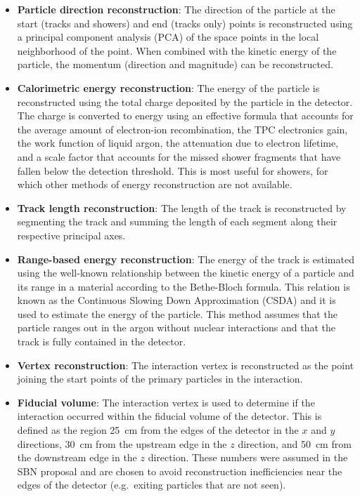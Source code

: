 \begin{itemize}
    \item \textbf{Particle direction reconstruction}: The direction of the particle at the start (tracks and showers) and end (tracks only) points is reconstructed using a principal component analysis (PCA) of the space points in the local neighborhood of the point. When combined with the kinetic energy of the particle, the momentum (direction and magnitude) can be reconstructed.
    \item \textbf{Calorimetric energy reconstruction}: The energy of the particle is reconstructed using the total charge deposited by the particle in the detector. The charge is converted to energy using an effective formula that accounts for the average amount of electron-ion recombination, the TPC electronics gain, the work function of liquid argon, the attenuation due to electron lifetime, and a scale factor that accounts for the missed shower fragments that have fallen below the detection threshold. This is most useful for showers, for which other methods of energy reconstruction are not available.
    \item \textbf{Track length reconstruction}: The length of the track is reconstructed by segmenting the track and summing the length of each segment along their respective principal axes. 
    \item \textbf{Range-based energy reconstruction}: The energy of the track is estimated using the well-known relationship between the kinetic energy of a particle and its range in a material according to the Bethe-Bloch formula. This relation is known as the Continuous Slowing Down Approximation (CSDA) and it is used to estimate the energy of the particle. This method assumes that the particle ranges out in the argon without nuclear interactions and that the track is fully contained in the detector.
    \item \textbf{Vertex reconstruction}: The interaction vertex is reconstructed as the point joining the start points of the primary particles in the interaction.
    \item \textbf{Fiducial volume}: The interaction vertex is used to determine if the interaction occurred within the fiducial volume of the detector. This is defined as the region \qty[mode=text]{25}{cm} from the edges of the detector in the $x$ and $y$ directions, \qty[mode=text]{30}{cm} from the upstream edge in the $z$ direction, and \qty[mode=text]{50}{cm} from the downstream edge in the $z$ direction. These numbers were assumed in the SBN proposal \cite{Acciarri2015} and are chosen to avoid reconstruction inefficiencies near the edges of the detector (e.g.\ exiting particles that are not seen).

\end{itemize}
